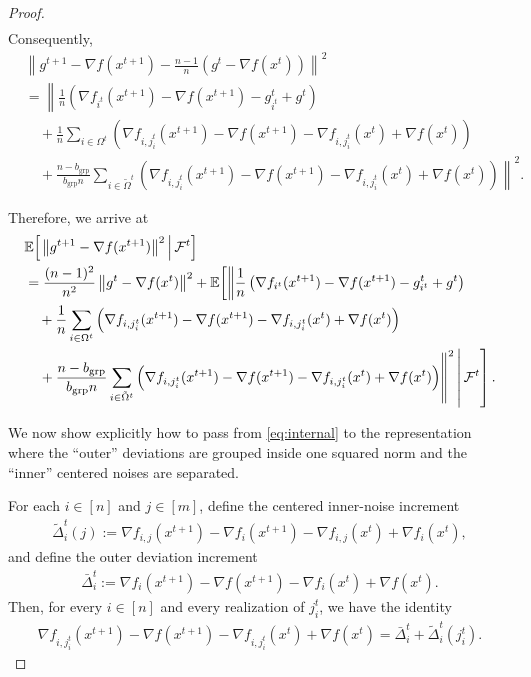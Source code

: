\documentclass{article}
\newcommand{\sqn}[1]{\left\| #1 \right\|^2}
\newcommand{\eqdef}{:=}
\newcommand{\Expb}[2]{\mathbb{E}\!\left[\left. #1\,\right|#2 \right]}
\newcommand{\Expc}[1]{\Expb{#1}{\mathcal{F}^t}}
\theoremstyle{plain}
\begin{document}
\begin{proof}
\begin{align*}
\end{align*}
Consequently,
\begin{align*}
&\sqn{g^{t+1}-\nabla f(x^{t+1})-\frac{n-1}{n}\left(g^t-\nabla f(x^{t})\right)}\\
&=\left\|\frac{1}{n}\left(\nabla f_{i^t}(x^{t+1})-\nabla f(x^{t+1})-g_{i^t}^t+g^t\right)\right.\\
&\quad+\frac{1}{n}\sum_{i\in\Omega^t}\left( \nabla f_{i,j_i^t}(x^{t+1})-\nabla f(x^{t+1})-\nabla f_{i,j_i^t}(x^{t})+\nabla f(x^{t})\right)\\
&\quad\left.{}+\frac{n-b_{\mathrm{grp}}}{b_{\mathrm{grp}}n} \sum_{i\in \tilde{\Omega}^t}\left( \nabla f_{i,j_i^t}(x^{t+1})-\nabla f(x^{t+1})-\nabla f_{i,j_i^t}(x^{t})+\nabla f(x^{t})\right)\right\|^2.
\end{align*}

Therefore, we arrive at
\begin{align}\label{eq:internal}
&\Expc{ \sqn{g^{t+1}-\nabla f(x^{t+1})}} \notag\\
&=\frac{(n-1)^2}{n^2} \sqn{g^t-\nabla f(x^{t})}
+\mathbb{E}\!\left[\left\|\frac{1}{n}\left(\nabla f_{i^t}(x^{t+1})-\nabla f(x^{t+1})-g_{i^t}^t+g^t\right)\right.\right. \notag\\
&\quad+\frac{1}{n}\sum_{i\in\Omega^t}\left( \nabla f_{i,j_i^t}(x^{t+1})-\nabla f(x^{t+1})-\nabla f_{i,j_i^t}(x^{t})+\nabla f(x^{t})\right) \notag\\
&\quad\left.\left.\left.\!\!\!{}+\frac{n-b_{\mathrm{grp}}}{b_{\mathrm{grp}}n} \sum_{i\in \tilde{\Omega}^t}\left( \nabla f_{i,j_i^t}(x^{t+1})-\nabla f(x^{t+1})-\nabla f_{i,j_i^t}(x^{t})+\nabla f(x^{t})\right)\right\|^2\,\right|\mathcal{F}^t\right].
\end{align}

We now show explicitly how to pass from \eqref{eq:internal}
to the representation where the ``outer'' deviations are grouped inside one squared norm and the ``inner'' centered noises are separated.

For each $i\in[n]$ and $j\in[m]$, define the centered inner-noise increment
\begin{align*}
\widetilde{\Delta}_i^t(j)\eqdef \nabla f_{i,j}(x^{t+1})-\nabla f_i(x^{t+1})-\nabla f_{i,j}(x^{t})+\nabla f_i(x^{t}),
\end{align*}
and define the outer deviation increment
\begin{align*}
\bar{\Delta}_i^t \eqdef \nabla f_i(x^{t+1})-\nabla f(x^{t+1})-\nabla f_i(x^{t})+\nabla f(x^{t}).
\end{align*}
Then, for every $i\in[n]$ and every realization of $j_i^t$, we have the identity
\begin{align}
\label{eq:split_inner_outer}
\nabla f_{i,j_i^t}(x^{t+1})-\nabla f(x^{t+1})-\nabla f_{i,j_i^t}(x^{t})+\nabla f(x^{t})
=\bar{\Delta}_i^t+\widetilde{\Delta}_i^t(j_i^t).
\end{align}


\end{proof}
\end{document}
